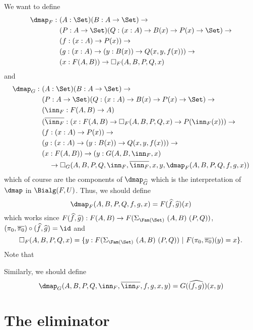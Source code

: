 \documentclass{article}
\begin{document}
We want to define
\begin{align*}
\dmap_F :\ & (A : \Set)(B : A \to \Set) \to \\
           & (P : A \to \Set)(Q : (x : A) \to B(x) \to P(x) \to \Set) \to \\
           & (f : (x : A) \to P(x)) \to \\ 
           & (g : (x : A) \to (y : B(x)) \to Q(x, y, f(x))) \to \\
           & (x : F(A, B)) \to \square_F(A, B, P, Q, x)
\end{align*}
and
\begin{align*}
\dmap_G :\ & (A : \Set)(B : A \to \Set) \to \\
           & (P : A \to \Set)(Q : (x : A) \to B(x) \to P(x) \to \Set) \to \\
           & (\inn_F : F(A, B) \to A) \\
           & (\overline{\inn_F} : (x : F(A, B) \to \square_F(A, B, P, Q, x) \to P(\inn_F(x))) \to \\
           & (f : (x : A) \to P(x)) \to \\ 
           & (g : (x : A) \to (y : B(x)) \to Q(x, y, f(x))) \to \\
           & (x : F(A, B)) \to (y : G(A, B, \inn_F, x) \\ 
           & \quad \to \square_G(A, B, P, Q, \inn_F, \overline{\inn_F}, x, y, \dmap_F(A, B, P, Q, f, g, x))
\end{align*}
which of course are the components of $\dmap_{\widehat{G}}$ which is
the interpretation of $\dmap$ in $\Bialg(F, U)$. Thus, we should
define
\[
\dmap_F(A, B, P, Q, f, g, x) = F(\widehat{f}, \widehat{g})(x)
\]
which works since $F(\widehat{f}, \widehat{g}) : F(A, B) \to
F(\Sigma_{\Fam(\Set)}\ (A, B)\ (P, Q))$, $(\pi_0, \overline{\pi_0})
\circ (\widehat{f}, \widehat{g}) = \id$ and 
\[
\square_F(A, B, P, Q, x)
= \{ y : F(\Sigma_{\Fam(\Set)}\ (A, B)\ (P, Q))\ |\ F(\pi_0,\overline{\pi_0})(y) = x\}.
\]
Note that 

Similarly, we should define
\[
\dmap_G(A, B, P, Q, \inn_F, \overline{\inn_F}, f, g, x, y) = G(\widehat{(f, g)})(x, y)
\]

\section{The eliminator}
\end{document}
